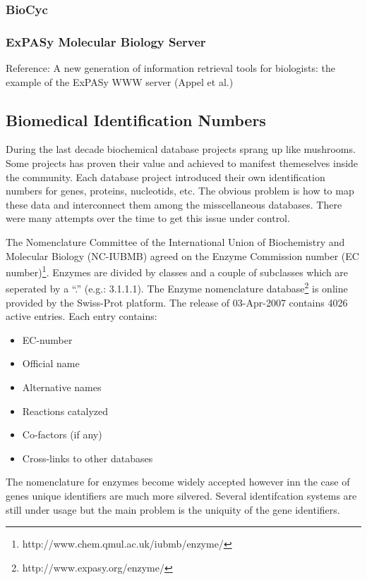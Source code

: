 \subsubsection{BioCyc}
\subsubsection{ExPASy Molecular Biology Server}

Reference: A new generation of information retrieval tools for biologists: the example of the ExPASy WWW server (Appel et al.)

\subsection{Biomedical Identification Numbers}

During the last decade biochemical database projects sprang up like mushrooms. Some projects has proven their value and achieved to manifest themeselves inside the community. Each database project introduced their own identification numbers for genes, proteins, nucleotids, etc. The obvious problem is how to map these data and interconnect them among the misscellaneous databases. 
There were many attempts over the time to get this issue under control.

The Nomenclature Committee of the International Union of Biochemistry and Molecular Biology (NC-IUBMB) agreed on the Enzyme Commission number (EC number)\footnote{http://www.chem.qmul.ac.uk/iubmb/enzyme/}\citep{Bairoch2000}. Enzymes are divided by classes and a couple of subclasses which are seperated by a ``.'' (e.g.: 3.1.1.1). The Enzyme nomenclature database\footnote{http://www.expasy.org/enzyme/} is online provided by the Swiss-Prot platform.
The release of 03-Apr-2007 contains 4026 active entries. 
Each entry contains:
\begin{itemize}
 \item EC-number
 \item Official name
 \item Alternative names
 \item Reactions catalyzed
 \item Co-factors (if any)
 \item Cross-links to other databases
\end{itemize}

The nomenclature for enzymes become widely accepted however inn the case of genes unique identifiers are much more silvered.
Several identifcation systems are still under usage but the main problem is the uniquity of the gene identifiers.

